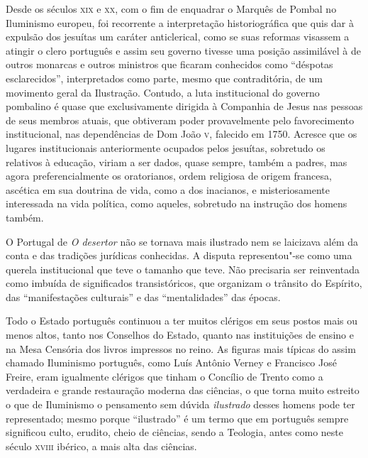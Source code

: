 Desde os séculos \textsc{xix} e \textsc{xx}, com o fim de enquadrar o Marquês de
Pombal no Iluminismo europeu, foi recorrente a interpretação historiográfica que
quis dar à expulsão dos jesuítas um caráter anticlerical, como se suas reformas
visassem a atingir o clero português e assim seu governo tivesse uma posição
assimilável à de outros monarcas e outros ministros que ficaram conhecidos como
``déspotas esclarecidos'', interpretados como parte, mesmo que contraditória, de
um movimento geral da Ilustração.  Contudo, a luta institucional do governo
pombalino é quase que exclusivamente dirigida à Companhia de Jesus nas pessoas
de seus membros atuais, que obtiveram poder provavelmente pelo favorecimento
institucional, nas dependências de Dom João \textsc{v}, falecido em 1750.
Acresce que os lugares institucionais anteriormente ocupados pelos jesuítas,
sobretudo os relativos à educação, viriam a ser dados, quase sempre, também a
padres, mas agora preferencialmente os oratorianos, ordem religiosa de origem
francesa, ascética em sua doutrina de vida, como a dos inacianos, e
misteriosamente interessada na vida política, como aqueles, sobretudo na
instrução dos homens também.

O Portugal de \textit{O desertor} não se tornava mais ilustrado nem se laicizava
além da conta e das tradições jurídicas conhecidas.  A disputa representou"-se
como uma querela institucional que teve o tamanho que teve.  Não precisaria ser
reinventada como imbuída de significados transistóricos, que organizam o
trânsito do Espírito, das ``manifestações culturais'' e das ``mentalidades'' das
épocas.

Todo o Estado português continuou a ter muitos clérigos em seus postos mais ou
menos altos, tanto nos Conselhos do Estado, quanto nas instituições de ensino e
na Mesa Censória dos livros impressos no reino.  As figuras mais típicas do
assim chamado Iluminismo português, como Luís Antônio Verney e Francisco José
Freire, eram igualmente clérigos que tinham o Concílio de Trento como a
verdadeira e grande restauração moderna das ciências, o que torna muito estreito
o que de Iluminismo o pensamento sem dúvida \textit{ilustrado} desses homens
pode ter representado; mesmo porque ``ilustrado'' é um termo que em português
sempre significou culto, erudito, cheio de ciências, sendo a Teologia, antes
como neste século \textsc{xviii} ibérico, a mais alta das ciências.

